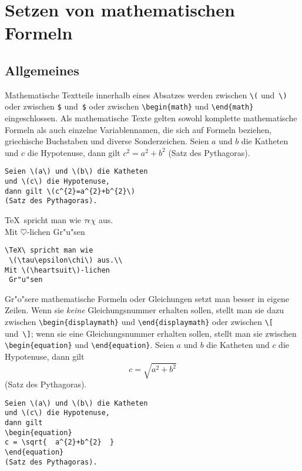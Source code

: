
\section{Setzen von mathematischen Formeln} \label{math}
 
\subsection{Allgemeines}
 
Mathematische Textteile innerhalb eines Absatzes werden zwischen
\verb|\(| und~\verb|\)| oder zwischen \verb|$| und~\verb|$| oder
zwischen \verb|\begin{math}| und \verb|\end{math}|
eingeschlossen.
Als mathematische Texte gelten sowohl komplette mathematische
Formeln als auch einzelne Variablennamen, die sich auf Formeln
beziehen, griechische Buchstaben und diverse Sonderzeichen.
\exa
Seien \(a\) und \(b\) die Katheten
und \(c\) die Hypotenuse,
dann gilt \(c^{2}=a^{2}+b^{2}\)
(Satz des Pythagoras).
\exb
\begin{verbatim}
Seien \(a\) und \(b\) die Katheten
und \(c\) die Hypotenuse,
dann gilt \(c^{2}=a^{2}+b^{2}\)
(Satz des Pythagoras).
\end{verbatim}
\exc
\exa
\TeX\ spricht man wie
 \(\tau\epsilon\chi\) aus.\\[6pt]
Mit \(\heartsuit\)-lichen
 Gr"u"sen
\exb
\begin{verbatim}
\TeX\ spricht man wie
 \(\tau\epsilon\chi\) aus.\\
Mit \(\heartsuit\)-lichen
 Gr"u"sen
\end{verbatim}
\exc
 
Gr"o"sere mathematische Formeln oder Gleichungen setzt man besser
in eigene Zeilen. Wenn sie \emph{keine} Gleichungsnummer erhalten 
sollen, stellt man sie dazu zwischen \verb|\begin{displaymath}| und
\verb|\end{displaymath}| oder zwischen \verb|\[| und~\verb|\]|; 
wenn sie eine Gleichungsnummer erhalten sollen, stellt man sie
zwischen \verb|\begin{equation}| und \verb|\end{equation}|.
\exa
Seien \(a\) und \(b\) die Katheten
und \(c\) die Hypotenuse,
dann gilt
\begin{equation}
c = \sqrt{  a^{2}+b^{2}  }
\end{equation}
(Satz des Pythagoras).
\exb
\begin{verbatim}
Seien \(a\) und \(b\) die Katheten
und \(c\) die Hypotenuse,
dann gilt
\begin{equation}
c = \sqrt{  a^{2}+b^{2}  }
\end{equation}
(Satz des Pythagoras).
\end{verbatim}
\exc

